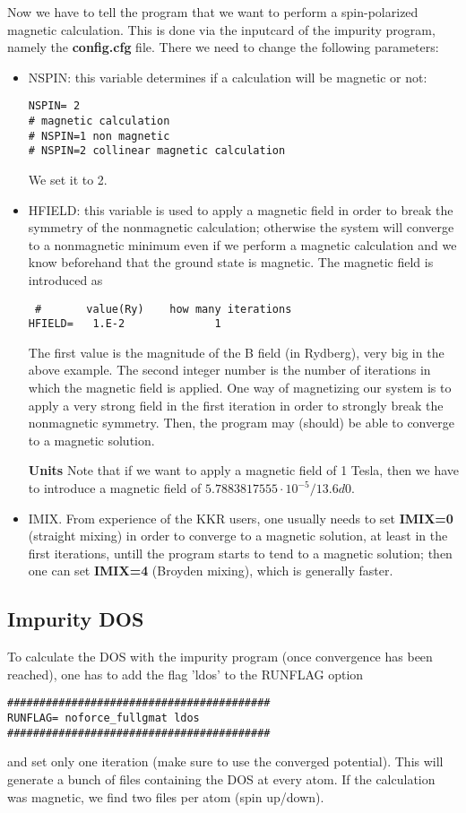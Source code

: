 \documentclass[a4paper,10pt,fullpage]{report}
\begin{document}
Now we have to tell the program that we want to perform a spin-polarized magnetic calculation.
This is done via the inputcard of the impurity program, namely the 
\textbf{config.cfg} file. 
There we need to change the following parameters:
\begin{itemize}
\item NSPIN: this variable determines if a calculation will be magnetic or not:
\begin{verbatim}
NSPIN= 2
# magnetic calculation
# NSPIN=1 non magnetic
# NSPIN=2 collinear magnetic calculation
\end{verbatim}
We set it to 2.

 \item HFIELD: this variable is used to apply a magnetic field in order to break the 
symmetry of the nonmagnetic calculation; otherwise the system will converge to a nonmagnetic 
minimum even if we perform a magnetic calculation and we know beforehand that the ground state
is magnetic. The magnetic field is introduced as
\begin{verbatim}
 #       value(Ry)    how many iterations
HFIELD=   1.E-2              1
\end{verbatim}
The first value is the magnitude of the B field (in Rydberg), very big in the above example. 
The second integer number is the number of iterations in which the magnetic field is applied.
One way of magnetizing our system is to apply a very strong field in the first iteration
in order to strongly break the nonmagnetic symmetry. Then, the program may (should)
be able to converge to a magnetic solution. 

\textbf{Units} Note that if we want to apply a magnetic field of 1 Tesla, then we
have to introduce a magnetic field of $5.7883817555\cdot10^{-5}/13.6d0$.

\item IMIX. From experience of the KKR users, one usually needs to set \textbf{IMIX=0} (straight mixing)
in order to converge to a magnetic solution, at least in the first iterations, untill the program
starts to tend to a magnetic solution; then one can set \textbf{IMIX=4} (Broyden mixing),
which is generally faster.

\end{itemize}


\subsection{Impurity DOS}

To calculate the DOS with the impurity program (once convergence has been reached), 
one has to add the flag 'ldos' to the RUNFLAG option
\begin{verbatim}
#########################################
RUNFLAG= noforce_fullgmat ldos
#########################################
\end{verbatim}
and set only one iteration (make sure to use the converged potential).
This will generate a bunch of files containing the DOS 
at every atom. If the calculation was magnetic, we find two
files per atom (spin up/down).
\end{document}

